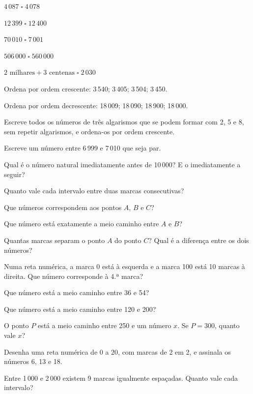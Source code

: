 \documentclass[12pt]{article}
\begin{document}
\begin{exercicios}
  \item $4\,087 \;\square\; 4\,078$
  \item $12\,399 \;\square\; 12\,400$
  \item $70\,010 \;\square\; 7\,001$
  \item $506\,000 \;\square\; 560\,000$
  \item $2 \text{ milhares} + 3 \text{ centenas} \;\square\; 2\,030$
  \item Ordena por ordem crescente: 3\,540; 3\,405; 3\,504; 3\,450.
  \item Ordena por ordem decrescente: 18\,009; 18\,090; 18\,900; 18\,000.
  \item Escreve todos os números de três algarismos que se podem formar com 2, 5 e 8, sem repetir algarismos, e ordena-os por ordem crescente.
  \item Escreve um número entre 6\,999 e 7\,010 que seja par.
  \item Qual é o número natural imediatamente antes de 10\,000? E o imediatamente a seguir?
\end{exercicios}


\begin{center}
\end{center}

\begin{exercicios}
  \item Quanto vale cada intervalo entre duas marcas consecutivas?
  \item Que números correspondem aos pontos $A$, $B$ e $C$?
  \item Que número está exatamente a meio caminho entre $A$ e $B$?
  \item Quantas marcas separam o ponto $A$ do ponto $C$? Qual é a diferença entre os dois números?
  \item Numa reta numérica, a marca 0 está à esquerda e a marca 100 está 10 marcas à direita. Que número corresponde à 4.ª marca?
  \item Que número está a meio caminho entre 36 e 54?
  \item Que número está a meio caminho entre 120 e 200?
  \item O ponto $P$ está a meio caminho entre 250 e um número $x$. Se $P = 300$, quanto vale $x$?
  \item Desenha uma reta numérica de 0 a 20, com marcas de 2 em 2, e assinala os números 6, 13 e 18.
  \item Entre 1\,000 e 2\,000 existem 9 marcas igualmente espaçadas. Quanto vale cada intervalo?
\end{exercicios}
\end{document}
